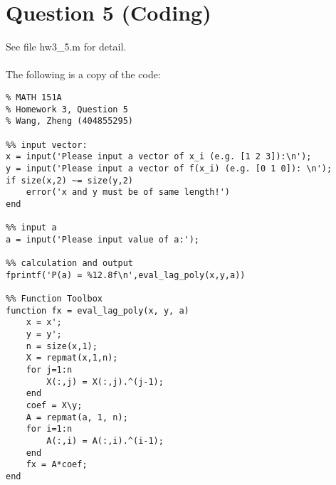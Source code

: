 \documentclass[11pt]{article}
\begin{document}
\section*{Question 5 (Coding)}
See file hw3\_5.m for detail.\\\\
The following is a copy of the code:
\begin{verbatim}
% MATH 151A 
% Homework 3, Question 5
% Wang, Zheng (404855295)

%% input vector:
x = input('Please input a vector of x_i (e.g. [1 2 3]):\n');
y = input('Please input a vector of f(x_i) (e.g. [0 1 0]): \n');
if size(x,2) ~= size(y,2)
    error('x and y must be of same length!')
end

%% input a
a = input('Please input value of a:');

%% calculation and output
fprintf('P(a) = %12.8f\n',eval_lag_poly(x,y,a))

%% Function Toolbox
function fx = eval_lag_poly(x, y, a)
    x = x';
    y = y';
    n = size(x,1);
    X = repmat(x,1,n);
    for j=1:n
        X(:,j) = X(:,j).^(j-1);
    end
    coef = X\y;
    A = repmat(a, 1, n);
    for i=1:n
        A(:,i) = A(:,i).^(i-1);
    end
    fx = A*coef;
end

\end{verbatim}
\end{document}
